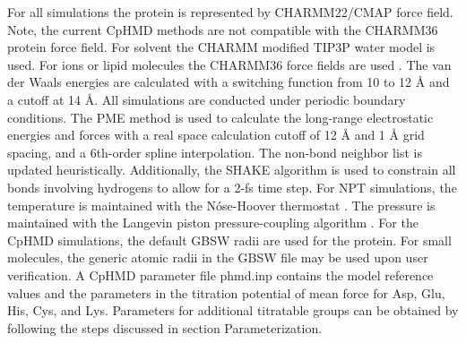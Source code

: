 For all simulations the protein 
is represented by CHARMM22/CMAP force field.\cite{MacKerell_Karplus_1998_J.Phys.Chem.B,MacKerell_Brooks_2004_J.Am.Chem.Soc.}
Note, the current CpHMD methods are not compatible with the CHARMM36 protein force field.
For solvent the CHARMM modified TIP3P water model is used.
For ions or lipid molecules the CHARMM36 force fields are used \cite{Klauda_Pastor_2010_J.Phys.Chem.B}.
The van der Waals energies are calculated with a switching function from 10 to 12 {\AA} and  a cutoff at 14 {\AA}. 
All simulations are conducted under periodic boundary conditions. 
The PME method \cite{Darden_Pedersen_1993_J.Chem.Phys.} is used to calculate the long-range electrostatic energies and forces with a real space calculation cutoff of 12 {\AA} and 1 {\AA} grid spacing, and a 6th-order spline interpolation. 
The non-bond neighbor list is updated heuristically. 
Additionally, the SHAKE \cite{Ryckaert_Berendsen_1977_J.Comput.Phys.} algorithm is used to constrain all bonds involving hydrogens to allow for a 2-fs time step. 
For NPT simulations, the temperature is maintained with the N\'{o}se-Hoover thermostat \cite{Nose_Nose_1984_Mol.Phys.,Hoover_Hoover_1985_Phys.Rev.Aa}.
The pressure is maintained with the Langevin piston pressure-coupling algorithm \cite{Feller_Brooks_1995_J.Chem.Phys.}.
For the CpHMD simulations, the default GBSW radii \cite{Nina_Roux_1997_J.Phys.Chem.B,Chen_Brooks_2006_J.Am.Chem.Soc.} are used for the protein.
For small molecules, the generic atomic radii in the GBSW file may be used upon user verification. 
A CpHMD parameter file phmd.inp contains
the model reference {\pka} values and the parameters in the titration potential of mean force for Asp, Glu, His, Cys, and Lys. 
Parameters for additional titratable groups
can be obtained by following the steps discussed in section Parameterization.
